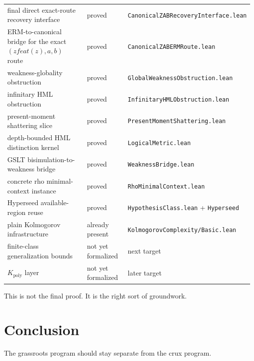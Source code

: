 \documentclass[11pt]{article}
\theoremstyle{remark}
\begin{document}
\begin{center}
\begin{tabular}{lll}
final direct exact-route recovery interface & proved & \texttt{CanonicalZABRecoveryInterface.lean} \\
ERM-to-canonical bridge for the exact $(zfeat(z),a,b)$ route & proved & \texttt{CanonicalZABERMRoute.lean} \\
weakness-globality obstruction & proved & \texttt{GlobalWeaknessObstruction.lean} \\
infinitary HML obstruction & proved & \texttt{InfinitaryHMLObstruction.lean} \\
present-moment shattering slice & proved & \texttt{PresentMomentShattering.lean} \\
depth-bounded HML distinction kernel & proved & \texttt{LogicalMetric.lean} \\
GSLT bisimulation-to-weakness bridge & proved & \texttt{WeaknessBridge.lean} \\
concrete rho minimal-context instance & proved & \texttt{RhoMinimalContext.lean} \\
Hyperseed available-region reuse & proved & \texttt{HypothesisClass.lean} + \texttt{Hyperseed} \\
plain Kolmogorov infrastructure & already present & \texttt{KolmogorovComplexity/Basic.lean} \\
finite-class generalization bounds & not yet formalized & next target \\
\(K_{\mathrm{poly}}\) layer & not yet formalized & later target \\
\bottomrule
\end{tabular}
\end{center}

This is not the final proof.  It is the right sort of groundwork.

\section{Conclusion}

The grassroots program should stay separate from the crux program.
\end{document}
